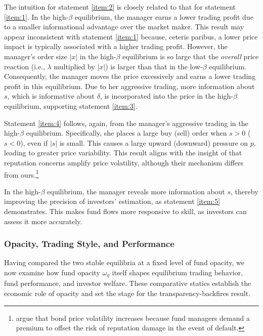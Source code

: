 The intuition for statement \ref{item:2} is closely related to that for statement \ref{item:1}. In the high-$\beta$ equilibrium, the manager earns a lower trading profit due to a smaller informational advantage over the market maker. This result may appear inconsistent with statement \ref{item:1} because, ceteris paribus, a lower price impact is typically associated with a higher trading profit. However, the manager's order size $|x|$ in the high-$\beta$ equilibrium is so large that the {\it overall} price reaction (i.e., $\lambda$ multiplied by $|x|$) is larger than that in the low-$\beta$ equilibrium. Consequently, the manager moves the price excessively and earns a lower trading profit in this equilibrium.
Due to her aggressive trading, more information about $s$, which is informative about $\delta$, is incorporated into the price in the high-$\beta$ equilibrium, supporting statement \ref{item:3}.

Statement \ref{item:4} follows, again, from the manager's aggressive trading in the high-$\beta$ equilibrium. Specifically, she places a large buy (sell) order when $s>0$ ($s<0$), even if $|s|$ is small. This causes a large upward (downward) pressure on $p$, leading to greater price variability. This result aligns with the insight of \citet{guerrieri2012fund} that reputation concerns amplify price volatility, although their mechanism differs from ours.\footnote{\citet{guerrieri2012fund} argue that bond price volatility increases because fund managers demand a premium to offset the risk of reputation damage in the event of default.}

In the high-$\beta$ equilibrium, the manager reveals more information about $s$, thereby improving the precision of investors' estimation, as statement \ref{item:5} demonstrates. This makes fund flows more responsive to skill, as investors can assess it more accurately.

\subsubsection{Opacity, Trading Style, and Performance}\label{sss:opacity_style_perf}
Having compared the two stable equilibria at a fixed level of fund opacity, we now examine how fund opacity $\omega_{\eta}$ itself shapes equilibrium trading behavior, fund performance, and investor welfare. These comparative statics establish the economic role of opacity and set the stage for the transparency-backfires result.

